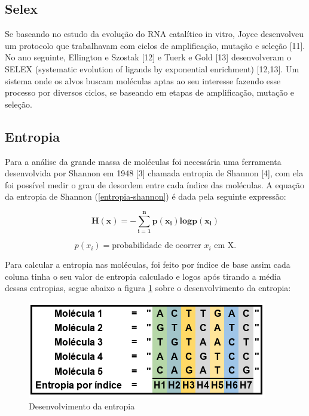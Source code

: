 \subsection{Selex}
Se baseando no estudo da evolução do RNA catalítico in vitro, Joyce desenvolveu um
protocolo que trabalhavam com ciclos de amplificação, mutação e seleção [11]\citep{11}. No ano seguinte, Ellington e Szostak [12]\citep{12} e Tuerk e Gold [13]\citep{13} desenvolveram o SELEX
(systematic evolution of ligands by exponential enrichment) [12,13]\citep{12,13}. Um sistema onde os alvos buscam moléculas aptas ao seu interesse fazendo esse processo por diversos ciclos, se baseando em etapas de amplificação, mutação e seleção.

\subsection{Entropia}

Para a análise da grande massa de moléculas foi necessária uma ferramenta
desenvolvida por Shannon em 1948 [3]\citep{3} chamada entropia de Shannon [4]\citep{4}, com ela foi
possível medir o grau de desordem entre cada índice das moléculas. A equação da entropia de
Shannon (\ref{entropia-shannon}) é dada pela seguinte expressão:

\begin{equation}
    \label{entropia-shannon}
    \mathbf{H(x) = -\sum\limits_{i=1}^{n}p(x_i)log p(x_i)}
\end{equation}

$$p(x_i)=\text{probabilidade de ocorrer } x_i\text{ em X.}$$

Para calcular a entropia nas moléculas, foi feito por índice de base assim cada
coluna tinha o seu valor de entropia calculado e logos após tirando a média dessas
entropias, segue abaixo a figura \ref{fig:example-entropia} sobre o desenvolvimento da entropia:

\begin{figure}[!h]
    \centering
    \includegraphics[scale=0.7]{figures/img-entropia.png}
    \caption{Desenvolvimento da entropia}
    \label{fig:example-entropia}
\end{figure}